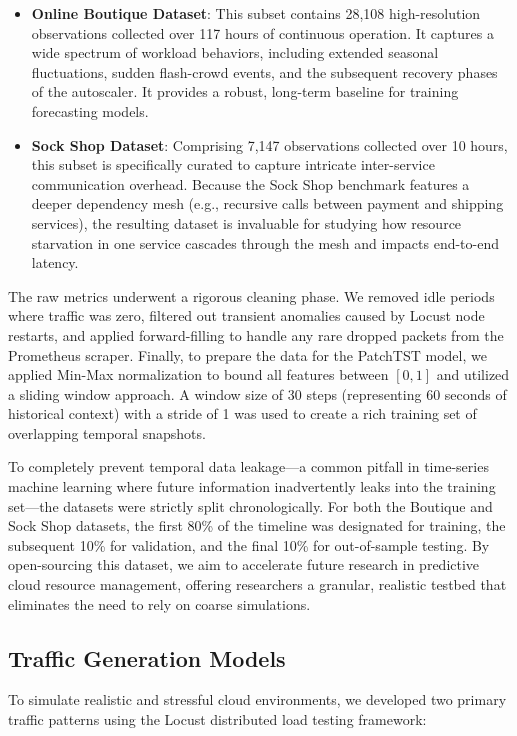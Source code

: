 \documentclass[conference]{IEEEtran}
\begin{document}
\begin{itemize}
    \item \textbf{Online Boutique Dataset}: This subset contains 28,108 high-resolution observations collected over 117 hours of continuous operation. It captures a wide spectrum of workload behaviors, including extended seasonal fluctuations, sudden flash-crowd events, and the subsequent recovery phases of the autoscaler. It provides a robust, long-term baseline for training forecasting models.
    \item \textbf{Sock Shop Dataset}: Comprising 7,147 observations collected over 10 hours, this subset is specifically curated to capture intricate inter-service communication overhead. Because the Sock Shop benchmark features a deeper dependency mesh (e.g., recursive calls between payment and shipping services), the resulting dataset is invaluable for studying how resource starvation in one service cascades through the mesh and impacts end-to-end latency.
\end{itemize}

The raw metrics underwent a rigorous cleaning phase. We removed idle periods where traffic was zero, filtered out transient anomalies caused by Locust node restarts, and applied forward-filling to handle any rare dropped packets from the Prometheus scraper. Finally, to prepare the data for the PatchTST model, we applied Min-Max normalization to bound all features between $[0, 1]$ and utilized a sliding window approach. A window size of 30 steps (representing 60 seconds of historical context) with a stride of 1 was used to create a rich training set of overlapping temporal snapshots. 

To completely prevent temporal data leakage—a common pitfall in time-series machine learning where future information inadvertently leaks into the training set—the datasets were strictly split chronologically. For both the Boutique and Sock Shop datasets, the first 80\% of the timeline was designated for training, the subsequent 10\% for validation, and the final 10\% for out-of-sample testing. By open-sourcing this dataset, we aim to accelerate future research in predictive cloud resource management, offering researchers a granular, realistic testbed that eliminates the need to rely on coarse simulations.

\subsection{Traffic Generation Models}
To simulate realistic and stressful cloud environments, we developed two primary traffic patterns using the Locust distributed load testing framework:
\end{document}
